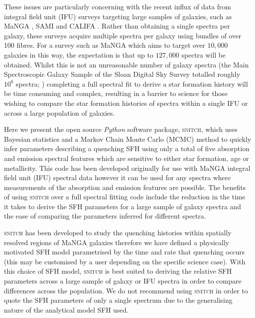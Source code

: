 \documentclass[useAMS,usenatbib]{mn2e}
\begin{document}
These issues are particularly concerning with the recent influx of data from integral field unit (IFU) surveys targeting large samples of galaxies, such as MaNGA \protect\citep[Mapping Nearby Galaxies at Apache Point Observatory;][]{bundy15}, SAMI \protect\citep[Sydney-AAO Multi-object Integral-field spectrograph;][]{bryant12} and CALIFA \protect\citep[Calar Alto Legacy Integral Field spectroscopy Area survey;][]{sanchez12}. Rather than obtaining a single spectra per galaxy, these surveys acquire multiple spectra per galaxy using bundles of over 100 fibres. For a survey such as MaNGA which aims to target over $10,000$ galaxies in this way, the expectation is that up to $127,000$ spectra will be obtained. Whilst this is not an unreasonable number of galaxy spectra (the Main Spectroscopic Galaxy Sample of the Sloan Digital Sky Survey totalled roughly $10^6$ spectra; \citealt{strauss02}) completing a full spectral fit to derive a star formation history will be time consuming and complex, resulting in a barrier to science for those wishing to compare the star formation histories of spectra within a single IFU or across a large population of galaxies.

Here we present the open source \emph{Python} software package, \textsc{snitch}, which uses Bayesian statistics and a Markov Chain Monte Carlo (MCMC) method to quickly infer parameters describing a quenching SFH using only a total of five absorption and emission spectral features which are sensitive to either star formation, age or metallicity. This code has been developed originally for use with MaNGA integral field unit (IFU) spectral data however it can be used for any spectra where measurements of the absorption and emission features are possible. The benefits of using \textsc{snitch} over a full spectral fitting code include the reduction in the time it takes to derive the SFH parameters for a large sample of galaxy spectra and the ease of comparing the parameters inferred for different spectra.

\textsc{snitch} has been developed to study the quenching histories within spatially resolved regions of MaNGA galaxies therefore we have defined a physically motivated SFH model parametrised by the time and rate that quenching occurs (this may be customised by a user depending on the specific science case). With this choice of SFH model, \textsc{snitch} is best suited to deriving the relative SFH parameters across a large sample of galaxy or IFU spectra in order to compare differences across the population. We do not recommend using \textsc{snitch} in order to quote the SFH parameters of only a single spectrum due to the generalising nature of the analytical model SFH used.  
\end{document}
